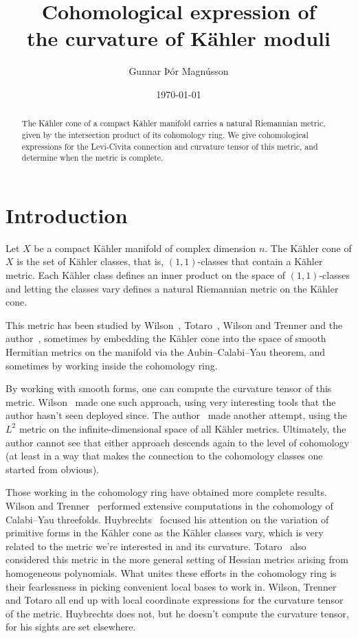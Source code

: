\documentclass[11pt,a4paper]{amsart}
\title[Curvature of K\"ahler moduli]%
{Cohomological expression of\\
the curvature of K\"{a}hler moduli}
\author{Gunnar Þór Magnússon}
\date{\today}
\theoremstyle{definition}
\theoremstyle{remark}
\begin{document}
\begin{abstract}
The K\"{a}hler cone of a compact K\"ahler manifold carries a natural Riemannian
metric, given by the intersection product of its cohomology ring. We give
cohomological expressions for the Levi-Civita connection and curvature tensor of
this metric, and determine when the metric is complete.
\end{abstract}

\maketitle



\section*{Introduction}

Let $X$ be a compact K\"{a}hler manifold of complex dimension $n$. The K\"{a}hler
cone of $X$ is the set of K\"{a}hler classes, that is, $(1,1)$-classes that contain
a K\"{a}hler metric. Each K\"{a}hler class defines an inner product on the space of
$(1,1)$-classes and letting the classes vary defines a natural Riemannian metric
on the K\"{a}hler cone. 

This metric has been studied by Wilson~\cite{Wilson}, Totaro~\cite{totaro},
Wilson and Trenner \cite{WilsonTrenner} and the author~\cite{Magnusson},
sometimes by embedding the K\"{a}hler cone into the space of smooth Hermitian
metrics on the manifold via the Aubin--Calabi--Yau theorem, and sometimes by
working inside the cohomology ring.

By working with smooth forms, one can compute the curvature tensor of this
metric. Wilson~\cite{Wilson} made one such approach, using very interesting
tools that the author hasn't seen deployed since. The author~\cite{Magnusson}
made another attempt, using the $L^2$ metric on the infinite-dimensional space
of all K\"ahler metrics. Ultimately, the author cannot see that either approach
descends again to the level of cohomology (at least in a way that makes the
connection to the cohomology classes one started from obvious).

Those working in the cohomology ring have obtained more complete results.
Wilson and Trenner~\cite{WilsonTrenner} performed extensive computations in the
cohomology of Calabi--Yau threefolds. Huybrechts~\cite{Huybrechts} focused his
attention on the variation of primitive forms in the K\"{a}hler cone as the K\"{a}hler
classes vary, which is very related to the metric we're interested in and its
curvature. Totaro~\cite{totaro} also considered this metric in the more general
setting of Hessian metrics arising from homogeneous polynomials.  What unites
these efforts in the cohomology ring is their fearlessness in picking convenient
local bases to work in. Wilson, Trenner and Totaro all end up with local
coordinate expressions for the curvature tensor of the metric. Huybrechts does
not, but he doesn't compute the curvature tensor, for his sights are set
elsewhere.
\end{document}
